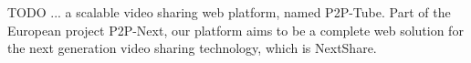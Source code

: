 TODO ... a scalable video sharing web platform, named P2P-Tube. Part of the European project P2P-Next, our platform aims to be a complete web solution for the next generation video sharing technology, which is NextShare.